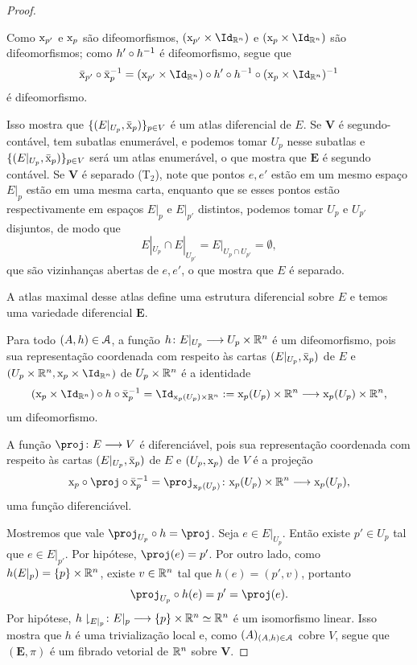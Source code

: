 \begin{proof}
\begin{enumerate}
Como $\mathrm{x}_{p'}$ e $\mathrm{x}_p$ são difeomorfismos, $(\x_{p'} \times \Id_{\R^n})$ e $(\x_p \times \Id_{\R^n})$ são difeomorfismos; como $h' \circ h^{-1}$ é difeomorfismo, segue que
	\begin{equation*}
	\bar\x_{p'} \circ {\bar\x_p}\inv = (\x_{p'} \times \Id_{\R^n}) \circ h' \circ h\inv \circ (\x_p \times \Id_{\R^n})\inv
	\end{equation*}
é difeomorfismo.

Isso mostra que $\{(E|_{U_p},\bar{\mathrm{x}}_p)\}_{p \in V}$ é um atlas diferencial de $E$. Se $\bm V$ é segundo-contável, tem subatlas enumerável, e podemos tomar $U_p$ nesse subatlas e $\{(E|_{U_p},\bar{\mathrm{x}}_p)\}_{p \in V}$ será um atlas enumerável, o que mostra que $\bm E$ é segundo contável. Se $\bm V$ é separado (T$_2$), note que pontos $e,e'$ estão em um mesmo espaço $E|_p$ estão em uma mesma carta, enquanto que se esses pontos estão respectivamente em espaços $E|_p$ e $E|_{p'}$ distintos, podemos tomar $U_p$ e $U_{p'}$ disjuntos, de modo que
	\begin{equation*}
	E|_{U_p} \cap E|_{U_{p'}} = E|_{U_p \cap U_{p'}} = \emptyset,
	\end{equation*}
que são vizinhanças abertas de $e,e'$, o que mostra que $E$ é separado.
\end{enumerate}

A atlas maximal desse atlas define uma estrutura diferencial sobre $E$ e temos uma variedade diferencial $\bm E$.

Para todo $(A,h) \in \mathcal{A}$, a função $h\colon E|_{U_p} \longrightarrow U_p \times \mathbb{R}^n$ é um difeomorfismo, pois sua representação coordenada com respeito às cartas $(E|_{U_p}, \bar{\mathrm{x}}_p)$ de $E$ e $(U_p \times \R^n,\x_p \times \Id_{\R^n})$ de $U_p \times \mathbb{R}^n$ é a identidade
	\begin{equation*}
	(\x_p \times \Id_{\R^n}) \circ h \circ {\bar\x_p}\inv = \Id_{\x_p(U_p) \times \R^n} := \x_p(U_p) \times \R^n \to \x_p(U_p) \times \R^n,
	\end{equation*}
um difeomorfismo.

A função $\proj\colon E \to V$ é diferenciável, pois sua representação coordenada com respeito às cartas $(E|_{U_p}, \bar{\mathrm{x}}_p)$ de $E$ e $(U_p,\mathrm{x}_p)$ de $V$ é a projeção
	\begin{equation*}
	\x_p \circ \proj \circ {\bar\x_p}\inv = \proj_{\x_p(U_p)}\colon \x_p(U_p) \times \R^n \to \x_p(U_p),
	\end{equation*}
uma função diferenciável.

Mostremos que vale $\proj_{U_p} \circ h = \proj$. Seja $e \in E|_{U_p}$. Então existe $p' \in U_p$ tal que $e \in E|_{p'}$. Por hipótese, $\proj(e)=p'$. Por outro lado, como $h(E|_p) = \{p\} \times \mathbb{R}^n$, existe $v \in \mathbb{R}^n$ tal que $h(e) = (p',v)$, portanto
	\begin{equation*}
	\proj_{U_p} \circ h(e) = p' = \proj(e).
	\end{equation*}
Por hipótese, $h\downharpoonright_{E|_p}\colon E|_p \longrightarrow \{p\} \times \mathbb{R}^n \simeq \mathbb{R}^n$ é um isomorfismo linear. Isso mostra que $h$ é uma trivialização local e, como $(A)_{(A,h) \in \mathcal{A}}$ cobre $V$, segue que $(\bm E,\pi)$ é um fibrado vetorial de $\mathbb{R}^n$ sobre $\bm V$.


\end{proof}
